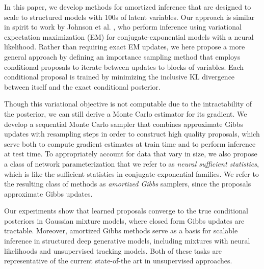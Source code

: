 \documentclass[anonymous=false, %
               format=acmsmall, %
               review=true, %
               screen=true, %
               nonacm=true]{acmart}
\theoremstyle{definition}
\begin{document}
In this paper, we develop methods for amortized inference that are designed to scale to structured models with 100s of latent variables. Our approach is similar in spirit to work by Johnson et al. \cite{johnson2016composing}, who perform inference using variational expectation maximization (EM) \cite{beal2003variational,bishop2006pattern,wainwright2008graphical} for conjugate-exponential models with a neural likelihood.  Rather than requiring exact EM updates, we here propose a more general approach by defining an importance sampling method that employs conditional proposals to iterate between updates to blocks of variables. Each conditional proposal is trained by minimizing the inclusive KL divergence between itself and the exact conditional posterior. 

Though this variational objective is not computable due to the intractability of the posterior, we can still derive a Monte Carlo estimator for its gradient. We develop a sequential Monte Carlo sampler \cite{delmoral2006sequential} that combines approximate Gibbs updates with resampling steps in order to construct high quality proposals, which serve both to compute gradient estimates at train time and to perform inference at test time. To appropriately account for data that vary in size, we also propose a class of network parameterization that we refer to as \emph{neural sufficient statistics}, which is like the sufficient statistics in conjugate-exponential families. We refer to the resulting class of methods as \emph{amortized Gibbs} samplers, since the proposals approximate Gibbs updates. 


Our experiments show that learned proposals converge to the true conditional posteriors in Gaussian mixture models, where closed form Gibbs updates are tractable. Moreover, amortized Gibbs methods serve as a basis for scalable inference in structured deep generative models, including mixtures with neural likelihoods and unsupervised tracking models. Both of these tasks are representative of the current state-of-the art in unsupervised approaches.
\end{document}
